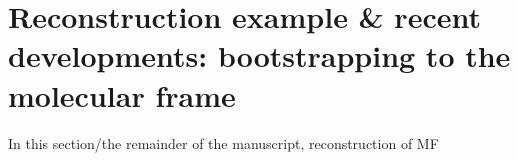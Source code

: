 \section{Reconstruction example & recent developments: bootstrapping to the molecular frame}

In this section/the remainder of the manuscript, reconstruction of MF 
